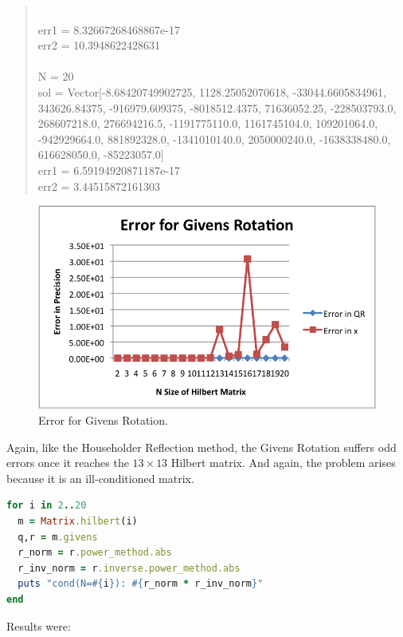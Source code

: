 \documentclass[letterpaper,12pt]{article}
\begin{document}
\begin{quote}
\\err1 = 8.32667268468867e-17
\\err2 = 10.3948622428631
\\
\\N = 20
\\sol = Vector[-8.68420749902725, 1128.25052070618, -33044.6605834961, 343626.84375, -916979.609375, -8018512.4375, 71636052.25, -228503793.0, 268607218.0, 276694216.5, -1191775110.0, 1161745104.0, 109201064.0, -942929664.0, 881892328.0, -1341010140.0, 2050000240.0, -1638338480.0, 616628050.0, -85223057.0]
\\err1 = 6.59194920871187e-17
\\err2 = 3.44515872161303
\end{quote}


\begin{figure}[H]
  \centering
  \includegraphics{givens.png}
  \caption{\label{givens}Error for Givens Rotation.}
\end{figure}

Again, like the Householder Reflection method, the Givens Rotation suffers odd
errors once it reaches the $13 \times 13$ Hilbert matrix.
And again, the problem arises because it is an ill-conditioned matrix.

\lstset{caption=Determining cond(R) for Givens}
\begin{lstlisting}[language=ruby]
for i in 2..20
  m = Matrix.hilbert(i)
  q,r = m.givens
  r_norm = r.power_method.abs
  r_inv_norm = r.inverse.power_method.abs
  puts "cond(N=#{i}): #{r_norm * r_inv_norm}"
end
\end{lstlisting}

Results were:
\end{document}
